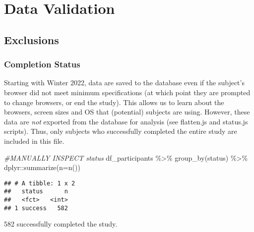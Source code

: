 \documentclass[
]{article}
\newenvironment{Shaded}{\begin{snugshade}}{\end{snugshade}}
\newcommand{\AttributeTok}[1]{\textcolor[rgb]{0.77,0.63,0.00}{#1}}
\newcommand{\CommentTok}[1]{\textcolor[rgb]{0.56,0.35,0.01}{\textit{#1}}}
\newcommand{\FunctionTok}[1]{\textcolor[rgb]{0.00,0.00,0.00}{#1}}
\newcommand{\NormalTok}[1]{#1}
\newcommand{\SpecialCharTok}[1]{\textcolor[rgb]{0.00,0.00,0.00}{#1}}
\begin{document}
\hypertarget{data-validation}{%
\section{Data Validation}\label{data-validation}}

\hypertarget{exclusions}{%
\subsection{Exclusions}\label{exclusions}}

\hypertarget{completion-status}{%
\subsubsection{Completion Status}\label{completion-status}}

Starting with Winter 2022, data are saved to the database even if the
subject's browser did not meet minimum specifications (at which point
they are prompted to change browsers, or end the study). This allows us
to learn about the browsers, screen sizes and OS that (potential)
subjects are using. However, these data are \emph{not} exported from the
database for analysis (see flatten.js and status.js scripts). Thus, only
subjects who successfully completed the entire study are included in
this file.

\begin{Shaded}
\begin{Highlighting}[]
\CommentTok{\#MANUALLY INSPECT status}
\NormalTok{df\_participants }\SpecialCharTok{\%\textgreater{}\%} \FunctionTok{group\_by}\NormalTok{(status) }\SpecialCharTok{\%\textgreater{}\%} 
\NormalTok{  dplyr}\SpecialCharTok{::}\FunctionTok{summarize}\NormalTok{(}\AttributeTok{n=}\FunctionTok{n}\NormalTok{())}
\end{Highlighting}
\end{Shaded}

\begin{verbatim}
## # A tibble: 1 x 2
##   status      n
##   <fct>   <int>
## 1 success   582
\end{verbatim}

582 successfully completed the study.
\end{document}
